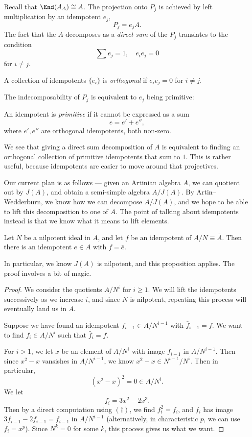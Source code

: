 \documentclass[a4paper]{article}
\begin{document}
Recall that $\End(A_A) \cong A$. The projection onto $P_j$ is achieved by left multiplication by an idempotent $e_j$,
\[
  P_j = e_j A.
\]
The fact that the $A$ decomposes as a \emph{direct sum} of the $P_j$ translates to the condition
\[
  \sum e_j = 1,\quad e_i e_j = 0
\]
for $i \not= j$.
\begin{defi}
  A collection of idempotents $\{e_i\}$ is \emph{orthogonal} if $e_i e_j = 0$ for $i \not= j$.
\end{defi}

The indecomposability of $P_j$ is equivalent to $e_j$ being primitive:
\begin{defi}
  An idempotent is \emph{primitive} if it cannot be expressed as a sum
  \[
    e = e' + e'',
  \]
  where $e', e''$ are orthogonal idempotents, both non-zero.
\end{defi}
We see that giving a direct sum decomposition of $A$ is equivalent to finding an orthogonal collection of primitive idempotents that sum to $1$. This is rather useful, because idempotents are easier to move around that projectives.

Our current plan is as follows --- given an Artinian algebra $A$, we can quotient out by $J(A)$, and obtain a semi-simple algebra $A/J(A)$. By Artin--Wedderburn, we know how we can decompose $A/J(A)$, and we hope to be able to lift this decomposition to one of $A$. The point of talking about idempotents instead is that we know what it means to lift elements.
\begin{prop}
  Let $N$ be a nilpotent ideal in $A$, and let $f$ be an idempotent of $A/N \equiv \bar{A}$. Then there is an idempotent $e \in A$ with $f = \bar{e}$.
\end{prop}
In particular, we know $J(A)$ is nilpotent, and this proposition applies. The proof involves a bit of magic.
\begin{proof}
  We consider the quotients $A/N^i$ for $i \geq 1$. We will lift the idempotents successively as we increase $i$, and since $N$ is nilpotent, repeating this process will eventually land us in $A$.

  Suppose we have found an idempotent $f_{i - 1} \in A/N^{i - 1}$ with $\bar{f}_{i - 1} = f$. We want to find $f_i \in A/N^i$ such that $\bar{f}_i = f$.

  For $i > 1$, we let $x$ be an element of $A/N^i$ with image $f_{i - 1}$ in $A/N^{i - 1}$. Then since $x^2 - x$ vansishes in $A/N^{i - 1}$, we know $x^2 - x \in N^{i - 1}/N^i$. Then in particular,
  \[
    (x^2 - x)^2 = 0 \in A/N^i.\tag{$\dagger$}
  \]
  We let
  \[
    f_i = 3x^2 - 2x^3.
  \]
  Then by a direct computation using $(\dagger)$, we find $f_i^2 = f_i$, and $f_i$ has image $3f_{i - 1} - 2 f_{i - 1} = f_{i - 1}$ in $A/N^{i - 1}$ (alternatively, in characteristic $p$, we can use $f_i = x^p$). Since $N^k = 0$ for some $k$, this process gives us what we want.
\end{proof}
\end{document}
